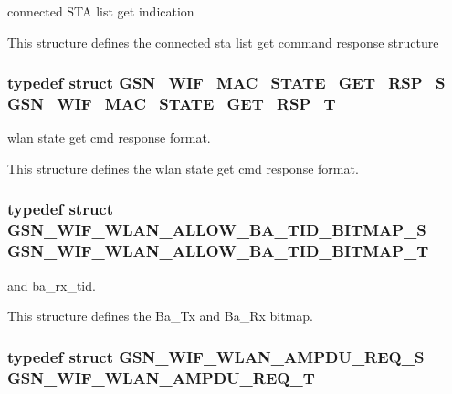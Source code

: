 connected STA list get indication 

This structure defines the connected sta list get command response structure \hypertarget{a00677_ga6dbab71e19ca02665a3be40e8850b059}{
\subsubsection[{GSN\_\-WIF\_\-MAC\_\-STATE\_\-GET\_\-RSP\_\-T}]{\setlength{\rightskip}{0pt plus 5cm}typedef struct {\bf GSN\_\-WIF\_\-MAC\_\-STATE\_\-GET\_\-RSP\_\-S} {\bf GSN\_\-WIF\_\-MAC\_\-STATE\_\-GET\_\-RSP\_\-T}}}
\label{a00677_ga6dbab71e19ca02665a3be40e8850b059}


wlan state get cmd response format. 

This structure defines the wlan state get cmd response format. \hypertarget{a00677_gafb05388636305e014ec95505951eca42}{
\subsubsection[{GSN\_\-WIF\_\-WLAN\_\-ALLOW\_\-BA\_\-TID\_\-BITMAP\_\-T}]{\setlength{\rightskip}{0pt plus 5cm}typedef struct {\bf GSN\_\-WIF\_\-WLAN\_\-ALLOW\_\-BA\_\-TID\_\-BITMAP\_\-S} {\bf GSN\_\-WIF\_\-WLAN\_\-ALLOW\_\-BA\_\-TID\_\-BITMAP\_\-T}}}
\label{a00677_gafb05388636305e014ec95505951eca42}
and ba\_\-rx\_\-tid.

This structure defines the Ba\_\-Tx and Ba\_\-Rx bitmap. \hypertarget{a00677_gade98eca1b34b9be5633f39a09c50f1d1}{
\subsubsection[{GSN\_\-WIF\_\-WLAN\_\-AMPDU\_\-REQ\_\-T}]{\setlength{\rightskip}{0pt plus 5cm}typedef struct {\bf GSN\_\-WIF\_\-WLAN\_\-AMPDU\_\-REQ\_\-S}  {\bf GSN\_\-WIF\_\-WLAN\_\-AMPDU\_\-REQ\_\-T}}}
\label{a00677_gade98eca1b34b9be5633f39a09c50f1d1}


